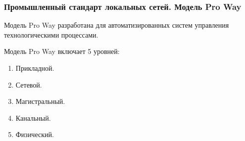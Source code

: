 \documentclass[12pt, russian, oneside, article]{ncc}
\begin{document}
\subsubsection{Промышленный стандарт локальных сетей. Модель Pro Way}
\label{sec-5_2_3}


Модель Pro Way разработана для автоматизированных систем управления технологическими процессами.

Модель Pro Way включает 5 уровней:
\begin{enumerate}
\item Прикладной.
\item Сетевой.
\item Магистральный.
\item Канальный.
\item Физический.
\end{enumerate}
\end{document}
